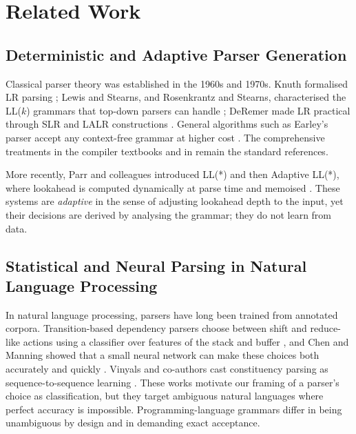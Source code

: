 \documentclass[12pt,a4paper]{article}
\begin{document}
\newpage
\section{Related Work}

\subsection{Deterministic and Adaptive Parser Generation}

Classical parser theory was established in the 1960s and 1970s. Knuth
formalised LR parsing \cite{knuth1965}; Lewis and Stearns, and Rosenkrantz and
Stearns, characterised the LL($k$) grammars that top-down parsers can handle
\cite{lewis1968,rosenkrantz1970}; DeRemer made LR practical through SLR and
LALR constructions \cite{deremer1971}. General algorithms such as Earley's
parser accept any context-free grammar at higher cost \cite{earley1970}. The
comprehensive treatments in the compiler textbooks \cite{aho2006,cooper2011}
and in \cite{grune2008} remain the standard references.

More recently, Parr and colleagues introduced LL(*) and then Adaptive LL(*),
where lookahead is computed dynamically at parse time and memoised
\cite{parr2011,parr2014}. These systems are \emph{adaptive} in the sense of
adjusting lookahead depth to the input, yet their decisions are derived by
analysing the grammar; they do not learn from data.

\subsection{Statistical and Neural Parsing in Natural Language Processing}

In natural language processing, parsers have long been trained from annotated
corpora. Transition-based dependency parsers choose between shift and
reduce-like actions using a classifier over features of the stack and buffer
\cite{nivre2003}, and Chen and Manning showed that a small neural network can
make these choices both accurately and quickly \cite{chen2014}. Vinyals and
co-authors cast constituency parsing as sequence-to-sequence learning
\cite{vinyals2015}. These works motivate our framing of a parser's choice as
classification, but they target ambiguous natural languages where perfect
accuracy is impossible. Programming-language grammars differ in being
unambiguous by design and in demanding exact acceptance.
\end{document}
